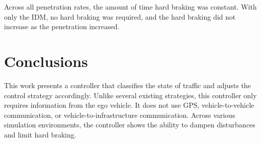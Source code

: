 \documentclass[conference]{IEEEtran}
\begin{document}


Across all penetration rates, the amount of time hard braking was constant. With only the IDM, no hard braking was required, and the hard braking did not increase as the penetration increased.


\section{Conclusions}

This work presents a controller that classifies the state of traffic and adjusts the control strategy accordingly. Unlike several existing strategies, this controller only requires information from the ego vehicle. It does not use GPS, vehicle-to-vehicle communication, or vehicle-to-infrastructure communication. Across various simulation environments, the controller shows the ability to dampen disturbances and limit hard braking.
\end{document}
